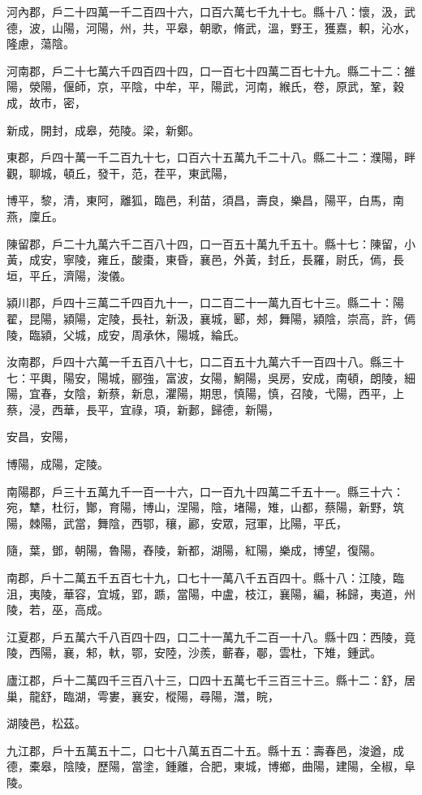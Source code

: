 \begin{pinyinscope}
河內郡，戶二十四萬一千二百四十六，口百六萬七千九十七。縣十八：懷，汲，武德，波，山陽，河陽，州，共，平皋，朝歌，脩武，溫，野王，獲嘉，軹，沁水，隆慮，蕩陰。

河南郡，戶二十七萬六千四百四十四，口一百七十四萬二百七十九。縣二十二：雒陽，滎陽，偃師，京，平陰，中牟，平，陽武，河南，緱氏，卷，原武，鞏，穀成，故市，密，

新成，開封，成皋，苑陵。梁，新鄭。

東郡，戶四十萬一千二百九十七，口百六十五萬九千二十八。縣二十二：濮陽，畔觀，聊城，頓丘，發干，范，茬平，東武陽，

博平，黎，清，東阿，離狐，臨邑，利苗，須昌，壽良，樂昌，陽平，白馬，南燕，廩丘。

陳留郡，戶二十九萬六千二百八十四，口一百五十萬九千五十。縣十七：陳留，小黃，成安，寧陵，雍丘，酸棗，東昏，襄邑，外黃，封丘，長羅，尉氏，傿，長垣，平丘，濟陽，浚儀。

潁川郡，戶四十三萬二千四百九十一，口二百二十一萬九百七十三。縣二十：陽翟，昆陽，潁陽，定陵，長社，新汲，襄城，郾，郟，舞陽，潁陰，崇高，許，傿陵，臨潁，父城，成安，周承休，陽城，綸氏。

汝南郡，戶四十六萬一千五百八十七，口二百五十九萬六千一百四十八。縣三十七：平輿，陽安，陽城，郦強，富波，女陽，鮦陽，吳房，安成，南頓，朗陵，細陽，宜春，女陰，新蔡，新息，灈陽，期思，慎陽，慎，召陵，弋陽，西平，上蔡，浸，西華，長平，宜祿，項，新郪，歸德，新陽，

安昌，安陽，

博陽，成陽，定陵。

南陽郡，戶三十五萬九千一百一十六，口一百九十四萬二千五十一。縣三十六：宛，犨，杜衍，酇，育陽，博山，涅陽，陰，堵陽，雉，山都，蔡陽，新野，筑陽，棘陽，武當，舞陰，西鄂，穰，酈，安眾，冠軍，比陽，平氏，

隨，葉，鄧，朝陽，魯陽，舂陵，新都，湖陽，紅陽，樂成，博望，復陽。

南郡，戶十二萬五千五百七十九，口七十一萬八千五百四十。縣十八：江陵，臨沮，夷陵，華容，宜城，郢，踬，當陽，中盧，枝江，襄陽，編，秭歸，夷道，州陵，若，巫，高成。

江夏郡，戶五萬六千八百四十四，口二十一萬九千二百一十八。縣十四：西陵，竟陵，西陽，襄，邾，軑，鄂，安陸，沙羨，蘄春，鄳，雲杜，下雉，鍾武。

廬江郡，戶十二萬四千三百八十三，口四十五萬七千三百三十三。縣十二：舒，居巢，龍舒，臨湖，雩婁，襄安，樅陽，尋陽，灊，睆，

湖陵邑，松茲。

九江郡，戶十五萬五十二，口七十八萬五百二十五。縣十五：壽春邑，浚遒，成德，橐皋，陰陵，歷陽，當塗，鍾離，合肥，東城，博鄉，曲陽，建陽，全椒，阜陵。


\end{pinyinscope}
